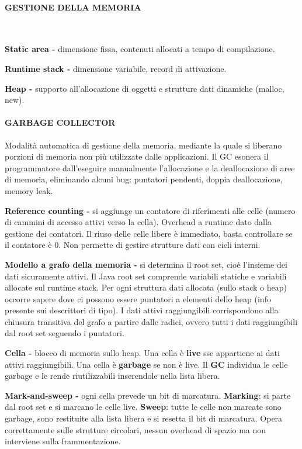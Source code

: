 \documentclass[a4paper, 12pt]{article}
\begin{document}
\paragraph{GESTIONE DELLA MEMORIA} \ 

\textbf{Static area -} dimensione fissa, contenuti allocati a tempo di compilazione.

\textbf{Runtime stack -} dimensione variabile, record di attivazione.

\textbf{Heap -} supporto all'allocazione di oggetti e strutture dati dinamiche (malloc,
new).

\paragraph{GARBAGE COLLECTOR}
Modalità automatica di gestione della memoria, mediante la quale si liberano porzioni di
memoria non più utilizzate dalle applicazioni. Il GC esonera il programmatore dall'eseguire
manualmente l'allocazione e la deallocazione di aree di memoria, eliminando alcuni bug:
puntatori pendenti, doppia deallocazione, memory leak.

\textbf{Reference counting -} si aggiunge un contatore di riferimenti alle celle (numero di
cammini di accesso attivi verso la cella). Overhead a runtime dato dalla gestione dei
contatori. Il riuso delle celle libere è immediato, basta controllare se il contatore è 0.
Non permette di gestire strutture dati con cicli interni.
 
\textbf{Modello a grafo della memoria -} si determina il root set, cioè l'insieme dei dati
sicuramente attivi. Il Java root set comprende variabili statiche e variabili allocate sul
runtime stack. Per ogni struttura dati allocata (sullo stack o heap) occorre sapere dove
ci possono essere puntatori a elementi dello heap (info presente sui descrittori di tipo). I
dati attivi raggiungibili corrispondono alla chiusura transitiva del grafo a partire dalle
radici, ovvero tutti i dati raggiungibili dal root set seguendo i puntatori.

\textbf{Cella -} blocco di memoria sullo heap. Una cella è \textbf{live} sse appartiene ai
dati attivi raggiungibili. Una cella è \textbf{garbage} se non è live. Il \textbf{GC}
individua le celle garbage e le rende riutilizzabili inserendole nella lista libera.

\textbf{Mark-and-sweep -} ogni cella prevede un bit di marcatura. \textbf{Marking}: si parte
dal root set e si marcano le celle live. \textbf{Sweep}: tutte le celle non marcate sono
garbage, sono restituite alla lista libera e si resetta il bit di marcatura. Opera
correttamente sulle strutture circolari, nessun overhead di spazio ma non interviene sulla
frammentazione.
\end{document}
